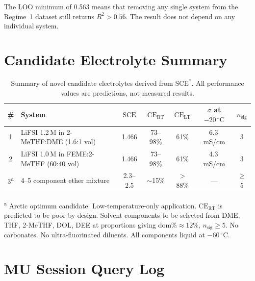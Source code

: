 \documentclass[12pt,letterpaper]{article}
\newcommand{\mSCE}{\mathrm{SCE}}
\newcommand{\mSCEstar}{\mathrm{SCE}^{*}}
\newcommand{\mCERT}{\mathrm{CE}_{\mathrm{RT}}}
\newcommand{\mCELT}{\mathrm{CE}_{\mathrm{LT}}}
\begin{document}
The LOO minimum of 0.563 means that removing any single
system from the Regime~1 dataset still returns
$R^{2} > 0.56$.
The result does not depend on any individual system.

\section{Candidate Electrolyte Summary}
\label{app:candidates}

\begin{table}[h!]
\centering
\caption{Summary of novel candidate electrolytes
derived from $\mSCEstar$.
All performance values are predictions, not measured
results.}
\label{tab:candidates}
\begin{tabularx}{\textwidth}{clccccc}
\toprule
\# & System
   & $\mSCE$
   & $\mCERT$
   & $\mCELT$
   & $\sigma$ at $-20\,^{\circ}\mathrm{C}$
   & $n_{\mathrm{sig}}$ \\
\midrule
1
  & LiFSI 1.2\,M in 2-MeTHF:DME (1.6:1 vol)
  & 1.466
  & 73--98\%
  & 61\%
  & 6.3\,mS/cm
  & 3 \\
2
  & LiFSI 1.0\,M in FEME:2-MeTHF (60:40 vol)
  & 1.466
  & 73--98\%
  & 61\%
  & 4.3\,mS/cm
  & 3 \\
3\textsuperscript{a}
  & 4--5 component ether mixture
  & 2.3--2.5
  & $\sim$15\%
  & $>$88\%
  & ---
  & $\geq$5 \\
\bottomrule
\end{tabularx}
\end{table}

\noindent\textsuperscript{a} Arctic optimum candidate.
Low-temperature-only application.
$\mCERT$ is predicted to be poor by design.
Solvent components to be selected from DME, THF,
2-MeTHF, DOL, DEE at proportions giving
$\mathrm{dom\%} \approx 12\%$,
$n_{\mathrm{sig}} \geq 5$.
No carbonates.
No ultra-fluorinated diluents.
All components liquid at $-60\,^{\circ}\mathrm{C}$.

\section{MU Session Query Log}
\label{app:mu}
\end{document}

